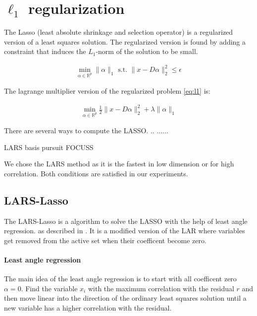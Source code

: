 \section {$\ell_1$ regularization}



The Lasso (least absolute shrinkage and selection operator) is a regularized version of a least squares solution.
The regularized version is found by adding a constraint that induces the $L_1$-norm of the solution to be small. \cite{Tibshirani1996}

\begin{align}
\min_{\alpha\in\mathbb{R}^{p}}   \lVert \alpha \rVert_{1}   \textrm{ s.t. } \lVert x - D\alpha \rVert^{2}_{2} \leq \epsilon\label{eq:l1}
\end{align}

The lagrange multiplier version of the regularized problem \ref{eq:l1} is:

\begin{align}
\min_{\alpha\in\mathbb{R}^{p}}  \frac{1}{2} \lVert x - D\alpha \rVert^{2}_{2} + \lambda \lVert \alpha \rVert_{1}
\end{align}

There are several ways to compute the LASSO. .. ...... 

LARS \cite{lars} basis pursuit\cite{BASIS_PURSUIT}  FOCUSS \cite{FOCUSS}

We chose the LARS method as it is the fastest in low dimension or for high correlation. Both conditions are satisfied in our experiments.


\subsection {LARS-Lasso}
\label{sec:lars}
The LARS-Lasso is a algorithm to solve the LASSO with the help of least angle regression.
as described in \cite{Efron2004}. It is a modified version of the LAR where variables get removed from the active set when their coefficent become zero.

\paragraph{Least angle regression}
The main idea of the least angle regression is to start with all coefficent zero $\alpha = 0$.
Find the variable $x_i$ with the maximum correlation with the residual $r$ and then move linear into the direction of the ordinary least squares solution
until a new variable has a higher correlation with the residual. 


